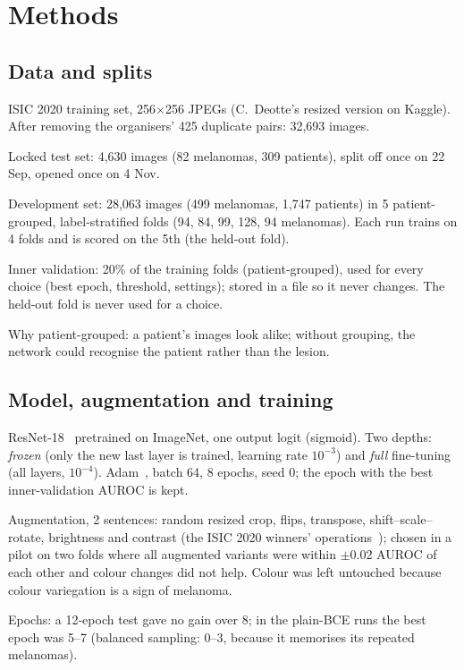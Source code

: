 \section{Methods}
\label{sec:methods}

\subsection{Data and splits}
\begin{notes}[~200 words]
  \item ISIC 2020 training set, 256$\times$256 JPEGs (C.~Deotte's resized version on Kaggle). After removing the organisers' 425 duplicate pairs: 32,693 images.
  \item Locked test set: 4,630 images (82 melanomas, 309 patients), split off once on 22 Sep, opened once on 4 Nov.
  \item Development set: 28,063 images (499 melanomas, 1,747 patients) in 5 patient-grouped, label-stratified folds (94, 84, 99, 128, 94 melanomas). Each run trains on 4 folds and is scored on the 5th (the held-out fold).
  \item Inner validation: 20\% of the training folds (patient-grouped), used for every choice (best epoch, threshold, settings); stored in a file so it never changes. The held-out fold is never used for a choice.
  \item Why patient-grouped: a patient's images look alike; without grouping, the network could recognise the patient rather than the lesion.
\end{notes}

\subsection{Model, augmentation and training}
\begin{notes}[~200 words]
  \item ResNet-18~\cite{he2016deep} pretrained on ImageNet, one output logit (sigmoid). Two depths: \emph{frozen} (only the new last layer is trained, learning rate $10^{-3}$) and \emph{full} fine-tuning (all layers, $10^{-4}$). Adam~\cite{kingma2015adam}, batch 64, 8 epochs, seed 0; the epoch with the best inner-validation AUROC is kept.
  \item Augmentation, 2 sentences: random resized crop, flips, transpose, shift--scale--rotate, brightness and contrast (the ISIC 2020 winners' operations~\cite{ha2020identifying}); chosen in a pilot on two folds where all augmented variants were within $\pm$0.02 AUROC of each other and colour changes did not help. Colour was left untouched because colour variegation is a sign of melanoma.
  \item Epochs: a 12-epoch test gave no gain over 8; in the plain-BCE runs the best epoch was 5--7 (balanced sampling: 0--3, because it memorises its repeated melanomas).
\end{notes}

